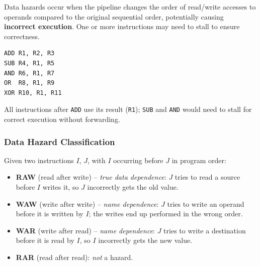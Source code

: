 \begin{definition}
Data hazards occur when the pipeline changes the order of read/write
accesses to operands compared to the original sequential order, potentially
causing \textbf{incorrect execution}. One or more instructions may need to
stall to ensure correctness.
\end{definition}

\begin{eg}[RAW on R1]
\leavevmode
\begin{lstlisting}
ADD R1, R2, R3
SUB R4, R1, R5
AND R6, R1, R7
OR  R8, R1, R9
XOR R10, R1, R11
\end{lstlisting}
All instructions after \texttt{ADD} use its result (\texttt{R1}); \texttt{SUB}
and \texttt{AND} would need to stall for correct execution without
forwarding.
\end{eg}

\subsubsection{Data Hazard Classification}

\begin{definition}
Given two instructions $I$, $J$, with $I$ occurring before $J$ in program
order:

\begin{itemize}
  \item \textbf{RAW} (read after write) -- \emph{true data dependence}: $J$
  tries to read a source before $I$ writes it, so $J$ incorrectly gets the
  old value.
  \item \textbf{WAW} (write after write) -- \emph{name dependence}: $J$
  tries to write an operand before it is written by $I$; the writes end up
  performed in the wrong order.
  \item \textbf{WAR} (write after read) -- \emph{name dependence}: $J$
  tries to write a destination before it is read by $I$, so $I$ incorrectly
  gets the new value.
  \item \textbf{RAR} (read after read): \emph{not} a hazard.
\end{itemize}
\end{definition}

